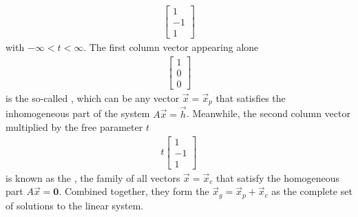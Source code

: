 \begin{solution}
\begin{align*}
\begin{bmatrix}
1 \\
-1 \\
1
\end{bmatrix}
\end{align*}
with $-\infty < t < \infty$. The first column vector appearing alone
\begin{align*}
\begin{bmatrix}
1 \\
0 \\
0
\end{bmatrix}    
\end{align*}
is the so-called , which can be any vector $\vec{x} = \vec{x}_p$ that satisfies the inhomogeneous part of the system $A\vec{x} = \vec{h}$. Meanwhile, the second column vector multiplied by the free parameter $t$
\begin{align*}
t
\begin{bmatrix}
1 \\
-1 \\
1
\end{bmatrix}    
\end{align*}
is known as the , the family of all vectors $\vec{x} = \vec{x}_c$ that satisfy the homogeneous part $A\vec{x} = \textbf{0}$. Combined together, they form the  $\vec{x}_g = \vec{x}_p + \vec{x}_c$ as the complete set of solutions to the linear system. 
\end{solution}
